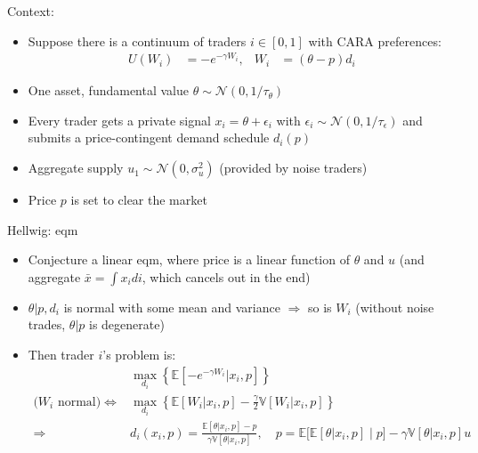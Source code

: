 \documentclass[english,10pt
,aspectratio=169
]{beamer}
\begin{document}
\begin{frame}{Context: \cite{hellwig_aggregation_1980}}
	\begin{itemize}
		\item Suppose there is a continuum of traders $i \in [0,1]$ with CARA preferences:
		\begin{align*}
			U(W_i)&=-e^{-\gamma W_i}, &
			W_i & = (\theta - p){d_i}
		\end{align*}
		\item One asset, fundamental value $\theta \sim \mathcal{N}(0,1/\tau_\theta)$
		\item Every trader gets a private signal $x_i = \theta + \epsilon_i$ with $\epsilon_i \sim \mathcal{N}(0,1/\tau_\epsilon)$ and submits a price-contingent demand schedule $d_i(p)$
		\item Aggregate supply $u_1 \sim \mathcal{N}(0, \sigma^2_u)$ (provided by noise traders)
		\item Price $p$ is set to clear the market
	\end{itemize}
\end{frame}


\begin{frame}{Hellwig: eqm}
	\begin{itemize}
		\item Conjecture a linear eqm, where price is a linear function of $\theta$ and $u$ (and aggregate $\bar{x} = \int x_i di$, which cancels out in the end)
		\item $\theta | p,d_i$ is normal with some mean and variance $\Rightarrow$ so is $W_i$
		(without noise trades, $\theta|p$ is degenerate)
		
		\item Then trader $i$'s problem is:
		\begin{align*}
			&\max_{d_i} \left\{ \mathbb{E} \left[ -e^{-\gamma W_i} | x_i, p \right] \right\} 
			\\
			\text{($W_i$ normal)} \iff 
			&\max_{d_i} \left\{\mathbb{E} \left[ W_i| x_i, p\right] - \frac{\gamma}{2} \mathbb{V}\left[W_i| x_i, p \right] \right\}
			\\
			\Rightarrow & d_i(x_i,p) = \frac{\mathbb{E} \left[ \theta | x_i, p\right] - p}{\gamma \mathbb{V} \left[ \theta| x_i, p\right]}, \quad p= \mathbb{E} \Big[ \mathbb{E} [\theta|x_i,p] \mid p \Big] - \gamma \mathbb{V} \left[ \theta| x_i, p\right] u
		\end{align*}
	\end{itemize}
\end{frame}
\end{document}
